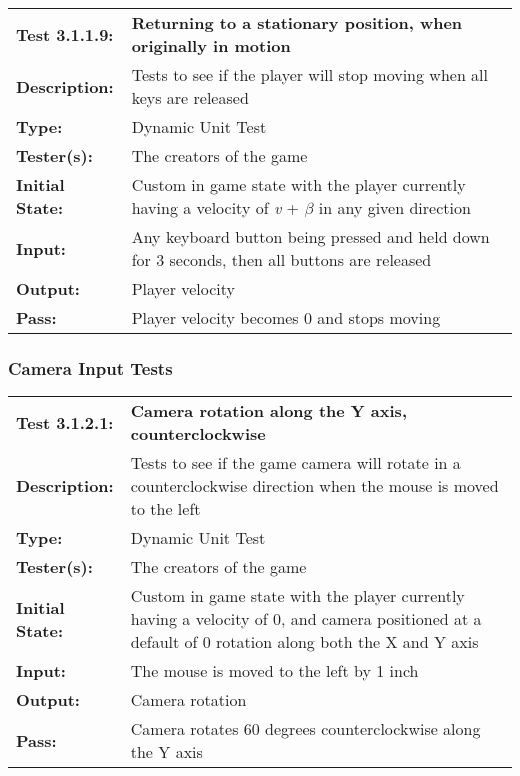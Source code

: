 \documentclass[12pt, titlepage]{article}
\begin{document}
\begin{mdframed}[linewidth=1pt]
\begin{tabularx}{\textwidth}{@{}p{3cm}X@{}}
{\bf Test 3.1.1.9:} & {\bf Returning to a stationary position, when originally in motion}\\[\baselineskip]
{\bf Description:} & Tests to see if the player will stop moving when all keys are released\\[0.5\baselineskip]
{\bf Type:} & Dynamic Unit Test\\[0.5\baselineskip]
{\bf Tester(s):} & The creators of the game\\[0.5\baselineskip]
{\bf Initial State:} & Custom in game state with the player currently having a velocity of \textit{v} + $\beta$ in any given direction\\[0.5\baselineskip]
{\bf Input:} & Any keyboard button being pressed and held down for 3 seconds, then all buttons are released \\[0.5\baselineskip]
{\bf Output:} & Player velocity\\[0.5\baselineskip]
{\bf Pass:} & Player velocity becomes 0 and stops moving
\end{tabularx}
\end{mdframed}

\subsubsection{Camera Input Tests}
\begin{mdframed}[linewidth=1pt]
\begin{tabularx}{\textwidth}{@{}p{3cm}X@{}}
{\bf Test 3.1.2.1:} & {\bf Camera rotation along the Y axis, counterclockwise}\\[\baselineskip]
{\bf Description:} & Tests to see if the game camera will rotate in a counterclockwise direction when the mouse is moved to the left\\[0.5\baselineskip]
{\bf Type:} & Dynamic Unit Test\\[0.5\baselineskip]
{\bf Tester(s):} & The creators of the game\\[0.5\baselineskip]
{\bf Initial State:} & Custom in game state with the player currently having a velocity of 0, and camera positioned at a default of 0 rotation along both the X and Y axis\\[0.5\baselineskip]
{\bf Input:} & The mouse is moved to the left by 1 inch\\[0.5\baselineskip]
{\bf Output:} & Camera rotation\\[0.5\baselineskip]
{\bf Pass:} & Camera rotates 60 degrees counterclockwise along the Y axis
\end{tabularx}
\end{mdframed}
\end{document}
